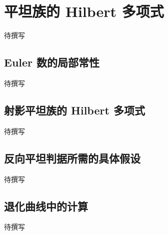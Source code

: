 
% 
% 
% 

\section{平坦族的 Hilbert 多项式}
\label{g5:sec:2005}

待撰写

\subsection{Euler 数的局部常性}
\label{g5:subsec:2005:01}
待撰写

\subsection{射影平坦族的 Hilbert 多项式}
\label{g5:subsec:2005:02}
待撰写

\subsection{反向平坦判据所需的具体假设}
\label{g5:subsec:2005:03}
待撰写

\subsection{退化曲线中的计算}
\label{g5:subsec:2005:04}
待撰写
